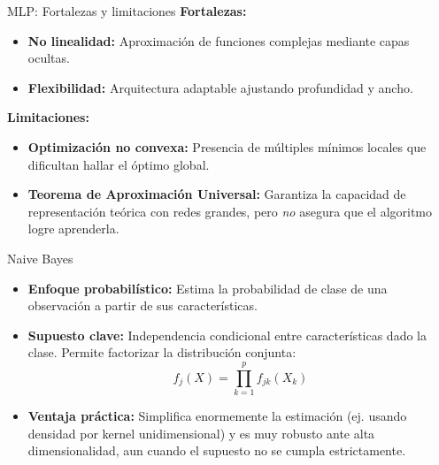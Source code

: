 \documentclass{beamer}
\begin{document}
\begin{frame}{MLP: Fortalezas y limitaciones}
    \textbf{Fortalezas:}
        \begin{itemize}
            \item \textbf{No linealidad:} Aproximación de funciones complejas mediante capas ocultas.
            
            \item \textbf{Flexibilidad:} Arquitectura adaptable ajustando profundidad y ancho.
        \end{itemize}
    
        \vspace{0.2cm}

    \textbf{Limitaciones:}
        \begin{itemize}
            \item \textbf{Optimización no convexa:} Presencia de múltiples mínimos locales que dificultan hallar el óptimo global.
            
            \item \textbf{Teorema de Aproximación Universal:} Garantiza la capacidad de representación teórica con redes grandes, pero \textit{no} asegura que el algoritmo logre aprenderla.
        \end{itemize}
\end{frame}


\begin{frame}{Naive Bayes}
    \begin{itemize}
        \item \textbf{Enfoque probabilístico:} Estima la probabilidad de clase de una observación a partir de sus características.
        
        \item \textbf{Supuesto clave:} Independencia condicional entre características dado la clase. Permite factorizar la distribución conjunta:
        $$f_j(X) = \prod_{k=1}^p f_{jk}(X_k)$$
        
        \item \textbf{Ventaja práctica:} Simplifica enormemente la estimación (ej. usando densidad por kernel unidimensional) y es muy robusto ante alta dimensionalidad, aun cuando el supuesto no se cumpla estrictamente.
    \end{itemize}
\end{frame}
\end{document}
